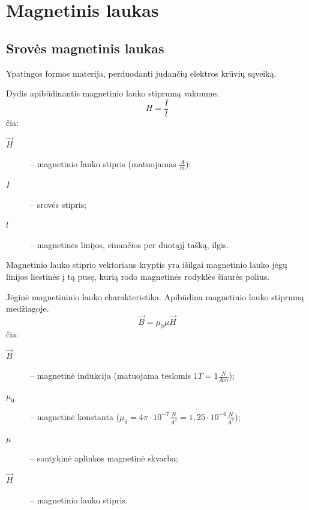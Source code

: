 \section{Magnetinis laukas}

\subsection{Srovės magnetinis laukas}

\begin{defn}
  Ypatingos formos materija, perduodanti judančių elektros krūvių
  sąveiką.
\end{defn}

\begin{defn}
  Dydis apibūdinantis magnetinio lauko stiprumą vakuume.
  \begin{equation*}
    H = \frac{I}{l}
  \end{equation*}
  čia:
  \begin{description}
    \item[$\vec{H}$] – magnetinio lauko stipris (matuojamas $\frac{A}{m}$);
    \item[$I$] – srovės stipris;
    \item[$l$] – magnetinės linijos, einančios per duotąjį tašką, ilgis.
  \end{description}
  Magnetinio lauko stiprio vektoriaus kryptis yra išilgai magnetinio
  lauko jėgų linijos liestinės į tą pusę, kurią rodo magnetinės rodyklės
  šiaurės polius.
\end{defn}

\begin{defn}
  Jėginė magnetininio lauko charakteristika. Apibūdina magnetinio lauko
  stiprumą medžiagoje.
  \begin{equation*}
    \vec{B} = \mu_{0} \mu \vec{H}
  \end{equation*}
  čia:
  \begin{description}
    \item[$\vec{B}$] – magnetinė indukcija (matuojama teslomis
      $1T = 1\frac{N}{Am}$);
    \item[$\mu_{0}$] – magnetinė konstanta 
      ($\mu_{0} = 4\pi \cdot 10^{-7} \frac{N}{A^{2}} = 1,25 \cdot 10^{-6} 
      \frac{N}{A^{2}}$);
    \item[$\mu$] – santykinė aplinkos magnetinė skvarba;
    \item[$\vec{H}$] – magnetinio lauko stipris.
  \end{description}
\end{defn}

